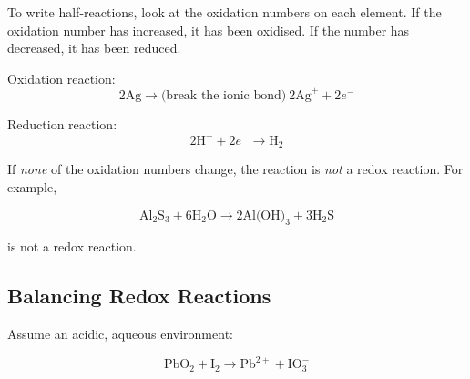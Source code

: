 \documentclass[a4paper, 12pt]{article}
\begin{document}
To write half-reactions, look at the oxidation numbers on each element. If the oxidation number has increased, it has been oxidised. If the number has decreased, it has been reduced.

Oxidation  reaction:
$$2\text{Ag} \longrightarrow  \text{(break the ionic bond)} \: 2\text{Ag}^+ + 2e^-$$

Reduction  reaction:
$$2\text{H}^+ + 2e^- \longrightarrow \text{H}_2$$

If \textit{none} of the oxidation numbers change, the reaction is \textit{not} a redox reaction. For example,

$$\text{Al}_2\text{S}_3 + 6 \text{H}_2\text{O} \longrightarrow 2\text{Al(OH)}_3 + 3\text{H}_2\text{S}$$

is not a redox reaction.

\subsection{Balancing Redox Reactions}
Assume an acidic, aqueous environment:

$$\text{PbO}_2 + \text{I}_2 \longrightarrow \text{Pb}^{2+} + \text{IO}_3^-$$
\end{document}
